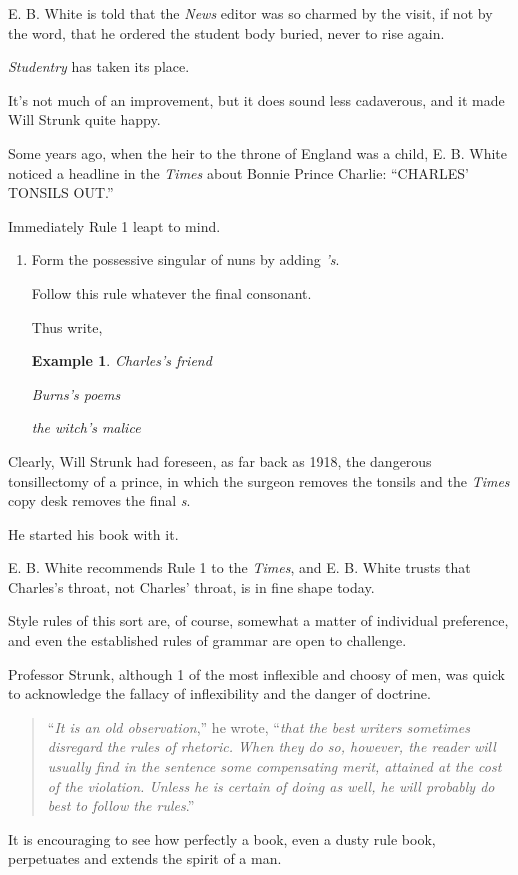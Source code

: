 \documentclass{book}
\numberwithin{equation}{section}
\newtheorem{example}{Example}[chapter]
\begin{document}
E. B. White is told that the \textit{News} editor was so charmed by the visit, if not by the word, that he ordered the student body buried, never to rise again.

\textit{Studentry} has taken its place.

It's not much of an improvement, but it does sound less cadaverous, and it made Will Strunk quite happy.

%
Some years ago, when the heir to the throne of England was a child, E. B. White noticed a headline in the \textit{Times} about Bonnie Prince Charlie: ``CHARLES' TONSILS OUT.''

Immediately Rule 1 leapt to mind.
\begin{enumerate}
    \item Form the possessive singular of nuns by adding \textit{'s}.
    
    Follow this rule whatever the final consonant.
    
    Thus write,
    \begin{example}
        Charles's friend
        
        Burns's poems
        
        the witch's malice
    \end{example}
\end{enumerate}
Clearly, Will Strunk had foreseen, as far back as 1918, the dangerous tonsillectomy of a prince, in which the surgeon removes the tonsils and the \textit{Times} copy desk removes the final \textit{s}.

He started his book with it.

E. B. White recommends Rule 1 to the \textit{Times}, and E. B. White trusts that Charles's throat, not Charles' throat, is in fine shape today.

%
Style rules of this sort are, of course, somewhat a matter of individual preference, and even the established rules of grammar are open to challenge.

Professor Strunk, although 1 of the most inflexible and choosy of men, was quick to acknowledge the fallacy of inflexibility and the danger of doctrine.
\begin{quotation}
    ``\textit{It is an old observation},'' he wrote, ``\textit{that the best writers sometimes disregard the rules of rhetoric. When they do so, however, the reader will usually find in the sentence some compensating merit, attained at the cost of the violation. Unless he is certain of doing as well, he will probably do best to follow the rules}.''
\end{quotation}
It is encouraging to see how perfectly a book, even a dusty rule book, perpetuates and extends the spirit of a man.
\end{document}

